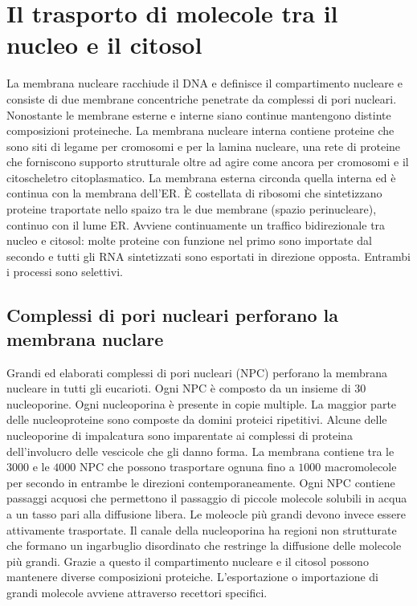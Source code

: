 \section{Il trasporto di molecole tra il nucleo e il citosol}
La membrana nucleare racchiude il DNA e definisce il compartimento nucleare e consiste di due membrane concentriche penetrate da complessi di pori nucleari. Nonostante le membrane
esterne e interne siano continue mantengono distinte composizioni proteineche. La membrana nucleare interna contiene proteine che sono siti di legame per cromosomi e per la lamina
nucleare, una rete di proteine che forniscono supporto strutturale oltre ad agire come ancora per cromosomi e il citoscheletro citoplasmatico. La membrana esterna circonda quella interna
ed \`e continua con la membrana dell'ER. \`E costellata di ribosomi che sintetizzano proteine traportate nello spaizo tra le due membrane (spazio perinucleare), continuo con il lume ER.
Avviene continuamente un traffico bidirezionale tra nucleo e citosol: molte proteine con funzione nel primo sono importate dal secondo e tutti gli RNA sintetizzati sono esportati in
direzione opposta. Entrambi i processi sono selettivi. 
\subsection{Complessi di pori nucleari perforano la membrana nuclare}
Grandi ed elaborati complessi di pori nucleari (NPC) perforano la membrana nucleare in tutti gli eucarioti. Ogni NPC \`e composto da un insieme di $30$ nucleoporine. Ogni nucleoporina
\`e presente in copie multiple. La maggior parte delle nucleoproteine sono composte da domini proteici ripetitivi. Alcune delle nucleoporine di impalcatura sono imparentate ai complessi
di proteina dell'involucro delle vescicole che gli danno forma. La membrana contiene tra le $3000$ e le $4000$ NPC che possono trasportare ognuna fino a $1000$ macromolecole per secondo
in entrambe le direzioni contemporaneamente. Ogni NPC contiene passaggi acquosi che permettono il passaggio di piccole molecole solubili in acqua a un tasso pari alla diffusione libera.
Le moleocle pi\`u grandi devono invece essere attivamente trasportate. Il canale della nucleoporina ha regioni non strutturate che formano un ingarbuglio disordinato che restringe la
diffusione delle molecole pi\`u grandi. Grazie a questo il compartimento nucleare e il citosol possono mantenere diverse composizioni proteiche. L'esportazione o importazione di 
grandi molecole avviene attraverso recettori specifici. 
